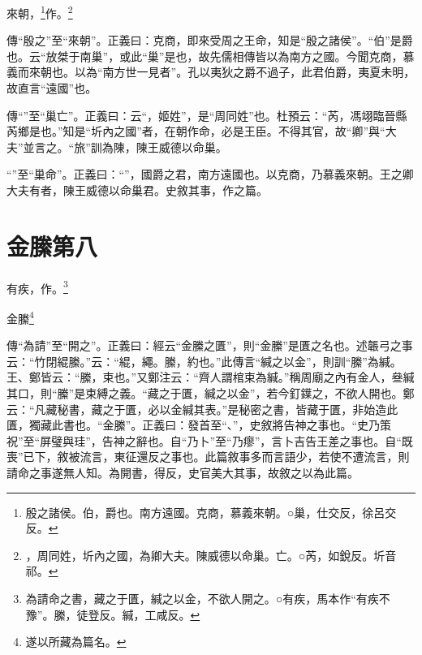 來朝，\footnote{殷之諸侯。伯，爵也。南方遠國。克商，慕義來朝。○巢，仕交反，徐呂交反。}作。\footnote{，周同姓，圻內之國，為卿大夫。陳威德以命巢。亡。○芮，如銳反。圻音祁。}


{\noindent\zhuan{}\fzbyks 傳“殷之”至“來朝”。正義曰：克商，即來受周之王命，知是“殷之諸侯”。“伯”是爵也。云“放桀于南巢”，或此“巢”是也，故先儒相傳皆以為南方之國。今聞克商，慕義而來朝也。以為“南方世一見者”。孔以夷狄之爵不過子，此君伯爵，夷夏未明，故直言“遠國”也。 \par}

{\noindent\zhuan{}\fzbyks 傳“”至“巢亡”。正義曰：云“，姬姓”，是“周同姓”也。杜預云：“芮，馮翊臨晉縣芮鄉是也。”知是“圻內之國”者，在朝作命，必是王臣。不得其官，故“卿”與“大夫”並言之。“旅”訓為陳，陳王威德以命巢。 \par}

{\noindent\shu{}\fzkt “”至“巢命”。正義曰：“”，國爵之君，南方遠國也。以克商，乃慕義來朝。王之卿大夫有者，陳王威德以命巢君。史敘其事，作之篇。 \par}

\section{金縢第八}


有疾，作。\footnote{為請命之書，藏之于匱，緘之以金，不欲人開之。○有疾，馬本作“有疾不豫”。縢，徒登反。緘，工咸反。}

金縢\footnote{遂以所藏為篇名。}

{\noindent\zhuan{}\fzbyks 傳“為請”至“開之”。正義曰：經云“金縢之匱”，則“金縢”是匱之名也。述韔弓之事云：“竹閉緄縢。”云：“緄，繩。縢，約也。”此傳言“緘之以金”，則訓“縢”為緘。王、鄭皆云：“縢，束也。”又鄭注云：“齊人謂棺束為緘。”稱周廟之內有金人，叄緘其口，則“縢”是束縛之義。“藏之于匱，緘之以金”，若今釘鐷之，不欲人開也。鄭云：“凡藏秘書，藏之于匱，必以金緘其表。”是秘密之書，皆藏于匱，非始造此匱，獨藏此書也。“金縢”。正義曰：發首至“、”，史敘將告神之事也。“史乃策祝”至“屏璧與珪”，告神之辭也。自“乃卜”至“乃瘳”，言卜吉告王差之事也。自“既喪”已下，敘被流言，東征還反之事也。此篇敘事多而言語少，若使不遭流言，則請命之事遂無人知。為開書，得反，史官美大其事，故敘之以為此篇。 \par}

